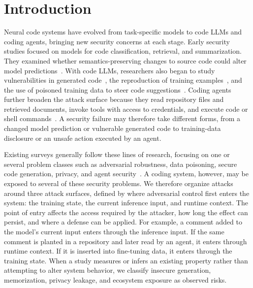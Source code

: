 \documentclass[acmsmall,screen,review]{acmart}
\begin{document}


\maketitle

\section{Introduction}
\label{sec:intro}

Neural code systems have evolved from task-specific models to code LLMs and coding agents, bringing new security concerns at each stage. Early security studies focused on models for code classification, retrieval, and summarization. They examined whether semantics-preserving changes to source code could alter model predictions~\cite{yefet2020adversarial,zhang2020generating}. With code LLMs, researchers also began to study vulnerabilities in generated code~\cite{pearce2022asleep}, the reproduction of training examples~\cite{ziegler2021recitation}, and the use of poisoned training data to steer code suggestions~\cite{schuster2021autocomplete}. Coding agents further broaden the attack surface because they read repository files and retrieved documents, invoke tools with access to credentials, and execute code or shell commands~\cite{liu2025yourai,xie2025redteaming}. A security failure may therefore take different forms, from a changed model prediction or vulnerable generated code to training-data disclosure or an unsafe action executed by an agent.

Existing surveys generally follow these lines of research, focusing on one or several problem classes such as adversarial robustness, data poisoning, secure code generation, privacy, and agent security~\cite{qu2024robustnesssurvey,securitycode2024slr,qu2025backdoorsurvey,maloyan2026promptinjection}. A coding system, however, may be exposed to several of these security problems. We therefore organize attacks around three attack surfaces, defined by where adversarial control first enters the system: the training state, the current inference input, and runtime context. The point of entry affects the access required by the attacker, how long the effect can persist, and where a defense can be applied. For example, a comment added to the model's current input enters through the inference input. If the same comment is planted in a repository and later read by an agent, it enters through runtime context. If it is inserted into fine-tuning data, it enters through the training state. When a study measures or infers an existing property rather than attempting to alter system behavior, we classify insecure generation, memorization, privacy leakage, and ecosystem exposure as observed risks.
\end{document}
